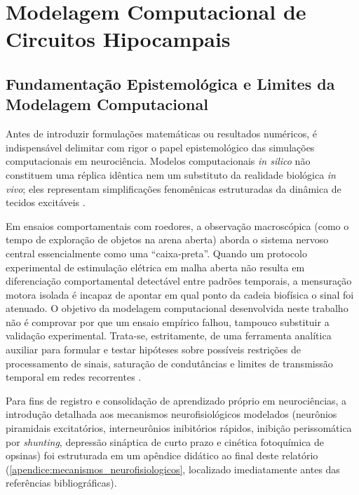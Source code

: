 \documentclass[12pt,openright,oneside,a4paper,brazil]{abntex2}
\begin{document}
\tableofcontents*
\cleardoublepage

\textual
\OnehalfSpacing

\chapter{Modelagem Computacional de Circuitos Hipocampais}

\section{Fundamentação Epistemológica e Limites da Modelagem Computacional}

Antes de introduzir formulações matemáticas ou resultados numéricos, é indispensável delimitar com rigor o papel epistemológico das simulações computacionais em neurociência. Modelos computacionais \emph{in silico} não constituem uma réplica idêntica nem um substituto da realidade biológica \emph{in vivo}; eles representam simplificações fenomênicas estruturadas da dinâmica de tecidos excitáveis \cite{dayan2001, gerstner2014}.

Em ensaios comportamentais com roedores, a observação macroscópica (como o tempo de exploração de objetos na arena aberta) aborda o sistema nervoso central essencialmente como uma ``caixa-preta''. Quando um protocolo experimental de estimulação elétrica em malha aberta não resulta em diferenciação comportamental detectável entre padrões temporais, a mensuração motora isolada é incapaz de apontar em qual ponto da cadeia biofísica o sinal foi atenuado. O objetivo da modelagem computacional desenvolvida neste trabalho não é comprovar por que um ensaio empírico falhou, tampouco substituir a validação experimental. Trata-se, estritamente, de uma ferramenta analítica auxiliar para formular e testar hipóteses sobre possíveis restrições de processamento de sinais, saturação de condutâncias e limites de transmissão temporal em redes recorrentes \cite{dayan2001, buzsaki2006}.

Para fins de registro e consolidação de aprendizado próprio em neurociências, a introdução detalhada aos mecanismos neurofisiológicos modelados (neurônios piramidais excitatórios, interneurônios inibitórios rápidos, inibição perissomática por \emph{shunting}, depressão sináptica de curto prazo e cinética fotoquímica de opsinas) foi estruturada em um apêndice didático ao final deste relatório (\cref{apendice:mecanismos_neurofisiologicos}, localizado imediatamente antes das referências bibliográficas).
\end{document}
